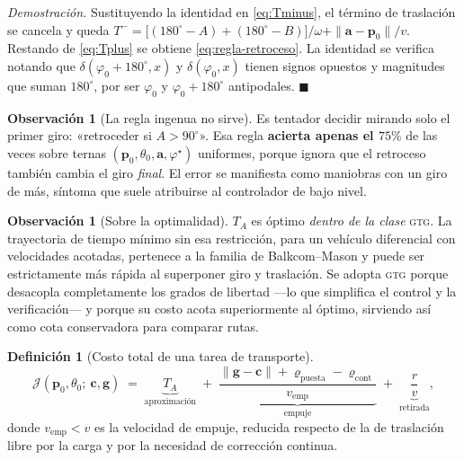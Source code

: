 \documentclass[11pt,a4paper]{article}
\theoremstyle{definition}
\newtheorem{definicion}[teorema]{Definición}
\newtheorem{observacion}[teorema]{Observación}
\newenvironment{demo}{\par\noindent\textit{Demostración.}\;}{\hfill$\blacksquare$\par\medskip}
\newcommand{\cc}{\mathbf{c}}
\newcommand{\pp}{\mathbf{p}}
\newcommand{\gv}{\mathbf{g}}
\newcommand{\aaa}{\mathbf{a}}
\newcommand{\grados}{^{\circ}}
\begin{document}
\begin{demo}
Sustituyendo la identidad en \eqref{eq:Tminus}, el término de traslación se cancela y
queda
$T^{-} = \big[(180\grados - A) + (180\grados - B)\big]/\omega + \|\aaa-\pp_0\|/v$.
Restando de \eqref{eq:Tplus} se obtiene \eqref{eq:regla-retroceso}. La identidad se
verifica notando que $\delta(\varphi_0+180\grados,x)$ y $\delta(\varphi_0,x)$ tienen
signos opuestos y magnitudes que suman $180\grados$, por ser $\varphi_0$ y
$\varphi_0+180\grados$ antipodales.
\end{demo}

\begin{observacion}[La regla ingenua no sirve]
Es tentador decidir mirando solo el primer giro: «retroceder si $A > 90\grados$». Esa
regla \textbf{acierta apenas el $75\%$} de las veces sobre ternas
$(\pp_0,\theta_0,\aaa,\varphi^\star)$ uniformes, porque ignora que el retroceso también
cambia el giro \emph{final}. El error se manifiesta como maniobras con un giro de más,
síntoma que suele atribuirse al controlador de bajo nivel.
\end{observacion}

\begin{observacion}[Sobre la optimalidad]
$T_A$ es óptimo \emph{dentro de la clase} \textsc{gtg}. La trayectoria de tiempo mínimo
sin esa restricción, para un vehículo diferencial con velocidades acotadas, pertenece a
la familia de Balkcom--Mason y puede ser estrictamente más rápida al superponer giro y
traslación. Se adopta \textsc{gtg} porque desacopla completamente los grados de libertad
---lo que simplifica el control y la verificación--- y porque su costo acota
superiormente al óptimo, sirviendo así como cota conservadora para comparar rutas.
\end{observacion}

\begin{definicion}[Costo total de una tarea de transporte]
\begin{equation}
  \mathcal J(\pp_0,\theta_0;\ \cc,\gv)
  \;=\; \underbrace{T_A}_{\text{aproximación}}
  \;+\; \underbrace{\frac{\|\gv-\cc\| + \varrho_{\mathrm{puesta}} - \varrho_{\mathrm{cont}}}{v_{\mathrm{emp}}}}_{\text{empuje}}
  \;+\; \underbrace{\frac{r}{v}}_{\text{retirada}} ,
  \label{eq:costo}
\end{equation}
donde $v_{\mathrm{emp}} < v$ es la velocidad de empuje, reducida respecto de la de
traslación libre por la carga y por la necesidad de corrección continua.
\end{definicion}
\end{document}
